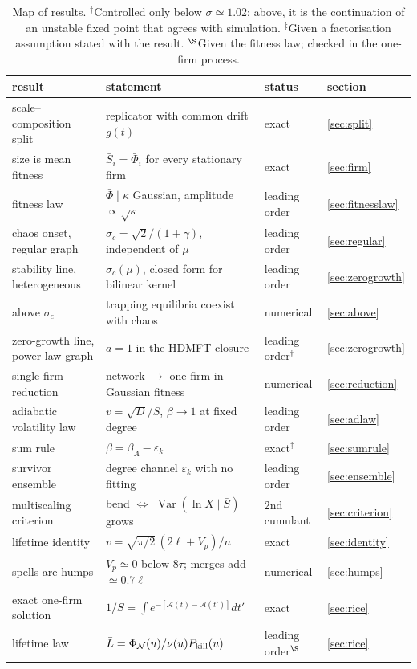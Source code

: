 \documentclass[11pt]{article}
\newcommand{\Var}{\operatorname{Var}}
\newcommand{\PhiN}{\Phi_{\mathcal N}}
\newcommand{\bPhi}{\bar\Phi}
\begin{document}
\begin{table}[h]
\centering\small\setlength{\tabcolsep}{4pt}
\begin{tabular}{p{}p{}ll}
\toprule
result & statement & status & section\\
\midrule
scale--composition split & replicator with common drift $g(t)$ & exact & \ref{sec:split}\\
size is mean fitness & $\bar S_i=\bPhi_i$ for every stationary firm & exact & \ref{sec:firm}\\
fitness law & $\bPhi\mid\kappa$ Gaussian, amplitude $\propto\sqrt\kappa$ & leading order & \ref{sec:fitnesslaw}\\
chaos onset, regular graph & $\sigma_c=\sqrt2/(1+\gamma)$, independent of $\mu$ & leading order & \ref{sec:regular}\\
stability line, heterogeneous & $\sigma_c(\mu)$, closed form for bilinear kernel & leading order & \ref{sec:zerogrowth}\\
above $\sigma_c$ & trapping equilibria coexist with chaos & numerical & \ref{sec:above}\\
zero-growth line, power-law graph & $a=1$ in the HDMFT closure & leading order$^\dagger$ & \ref{sec:zerogrowth}\\
single-firm reduction & network $\to$ one firm in Gaussian fitness & numerical & \ref{sec:reduction}\\
adiabatic volatility law & $v=\sqrt D/S$, $\beta\to1$ at fixed degree & leading order & \ref{sec:adlaw}\\
sum rule & $\beta=\beta_A-\varepsilon_k$ & exact$^\ddagger$ & \ref{sec:sumrule}\\
survivor ensemble & degree channel $\varepsilon_k$ with no fitting & leading order & \ref{sec:ensemble}\\
multiscaling criterion & bend $\Leftrightarrow$ $\Var(\ln X\mid\bar S)$ grows & 2nd cumulant & \ref{sec:criterion}\\
lifetime identity & $v=\sqrt{\pi/2}\,(2\ell+V_p)/n$ & exact & \ref{sec:identity}\\
spells are humps & $V_p\simeq0$ below $8\tau$; merges add $\simeq0.7\ell$ & numerical & \ref{sec:humps}\\
exact one-firm solution & $1/S=\int e^{-[\mathcal A(t)-\mathcal A(t')]}dt'$ & exact & \ref{sec:rice}\\
lifetime law & $\bar L=\PhiN(u)/\nu(u)P_{\rm kill}(u)$ & leading order$^\S$ & \ref{sec:rice}\\
\bottomrule
\end{tabular}
\caption{Map of results.  $^\dagger$Controlled only below $\sigma\simeq1.02$; above, it is the
continuation of an unstable fixed point that agrees with simulation.  $^\ddagger$Given a
factorisation assumption stated with the result.  $^\S$Given the fitness law; checked in the one-firm process.}
\label{tab:map}
\end{table}
\end{document}
